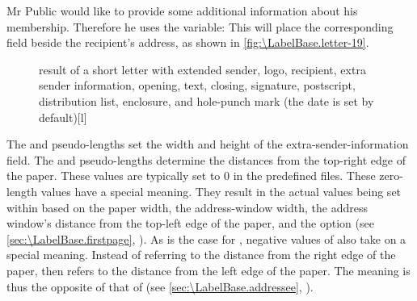 \begin{Example}
  Mr Public would like to provide some additional information about his
  membership. Therefore he uses the  variable:%
  This will place the corresponding field beside the recipient's address, as
  shown in \autoref{fig:\LabelBase.letter-19}.
  \begin{figure}
    \setcapindent{0pt}%
    \begin{captionbeside}
      {result of a short letter with extended sender, logo, recipient,
        extra sender information, opening, text, closing, signature,
        postscript, distribution list, enclosure, and hole-punch mark (the
        date is set by default)}[l]
    \end{captionbeside}
    \label{fig:\LabelBase.letter-19}
  \end{figure}
\end{Example}
\EndIndexGroup
\EndIndexGroup


\begin{Declaration}
\end{Declaration}
The  and
 pseudo-lengths set the
width and height of the extra-sender-information field. The 
and  pseudo-lengths determine the distances from the
top-right edge of the paper. These values are typically set to 0 in
the predefined  files. These zero-length values
have a special meaning. They result in the actual values being set within
 based on the paper width, the address-window
width, the address window's distance from the top-left edge of the paper, and
the  option (see
\autoref{sec:\LabelBase.firstpage}, ). As
is the case for , negative values of 
also take on a special meaning. Instead of referring to the distance from the
right edge of the paper,  then refers to the distance from
the left edge of the paper. The meaning is thus the opposite of that of
 (see \autoref{sec:\LabelBase.addressee},
).%
\EndIndexGroup
%
\EndIndexGroup



